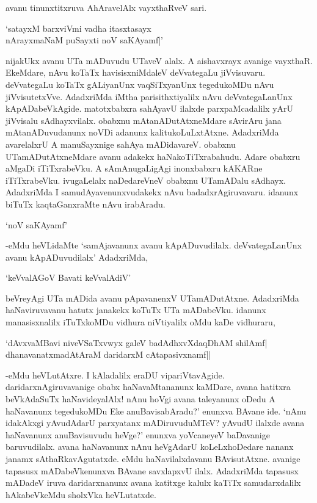 avanu tinunxtitxruva AhAravelAlx vayxthaRveV sari.

\begin{shloka}
`satayxM barxviVmi vadha itasxtasayx\\
nArayxmaNaM puSayxti noV saKAyamf|'
\end{shloka}

nijakUkx avanu UTa mADuvudu UTaveV alalx. A aishavxrayx avanige vayxthaR. EkeMdare, nAvu koTaTx havisisxniMdaleV deVvategaLu jiVvisuvaru. deVvategaLu koTaTx gALiyanUnx vaqSiTxyanUnx tegedukoMDu nAvu jiVvisutetxVve. AdadxriMda iMtha parisithxtiyalilx nAvu deVvategaLanUnx kApADabeVkAgide. matotxbabxra sahAyavU ilalxde parxpaMcadalilx yArU jiVvisalu sAdhayxvilalx. obabxnu mAtanADutAtxneMdare sAvirAru jana mAtanADuvudanunx noVDi adanunx kalitukoLuLxtAtxne. AdadxriMda avarelalxrU A manuSayxnige sahAya mADidavareV. obabxnu UTamADutAtxneMdare avanu adakekx haNakoTiTxrabahudu. Adare obabxru aMgaDi iTiTxrabeVku. A sAmAnugaLigAgi inonxbabxru kAKARne iTiTxrabeVku. ivugaLelalx naDedareVneV obabxnu UTamADalu sAdhayx. AdadxriMda I samudAyavenunxvudakekx nAvu badadxrAgiruvavaru. idanunx biTuTx kaqtaGanxraMte nAvu irabAradu.

\begin{shloka}
`noV saKAyamf'
\end{shloka}

-eMdu heVLidaMte `samAjavanunx avanu kApADuvudilalx. deVvategaLanUnx avanu kApADuvudilalx' AdadxriMda,

\begin{shloka}
`keVvalAGoV Bavati keVvalAdiV'
\end{shloka}

beVreyAgi UTa mADida avanu pApavanenxV UTamADutAtxne. AdadxriMda haNaviruvavanu hatutx janakekx koTuTx UTa mADabeVku. idanunx manasisxnalilx iTuTxkoMDu vidhura niVtiyalilx oMdu kaDe vidhuraru,

\begin{shloka}
`dAvxvaMBavi niveVSaTxvwyx galeV badAdhxvXdaqDhAM shilAmf|\\
dhanavanatxmadAtAraM daridarxM cAtapasivxnamf||
\end{shloka}

-eMdu heVLutAtxre. I kAladalilx eraDU vipariVtavAgide. daridarxnAgiruvavanige obabx haNavaMtananunx kaMDare, avana hatitxra beVkAdaSuTx haNavideyalAlx! nAnu hoVgi avana taleyanunx oDedu A haNavanunx tegedukoMDu Eke anuBavisabAradu?' enunxva BAvane ide. `nAnu idakAkxgi yAvudAdarU parxyatanx mADiruvuduMTeV? yAvudU ilalxde avana haNavanunx anuBavisuvudu heVge?' enunxva yoVcaneyeV baDavanige baruvudilalx. avana haNavanunx nAnu heVgAdarU koLeLxhoDedare nananx janamx sAthaRkavAgutatxde. eMdu haNavilalxdavanu BAvisutAtxne. avanige tapasusx mADabeVkenunxva BAvane savxlapxvU ilalx. AdadxriMda tapasusx mADadeV iruva daridarxnanunx avana katitxge kalulx kaTiTx samudarxdalilx hAkabeVkeMdu sholxVka heVLutatxde.

